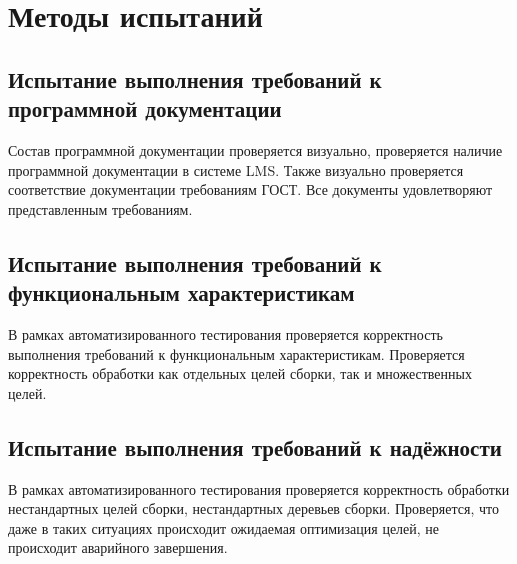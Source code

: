 \section{Методы испытаний}

\subsection{Испытание выполнения требований к программной документации}

Состав программной документации проверяется визуально, проверяется наличие программной документации в системе LMS. Также визуально проверяется соответствие документации требованиям ГОСТ. 
Все документы удовлетворяют представленным требованиям.

\subsection{Испытание выполнения требований к функциональным характеристикам}

В рамках автоматизированного тестирования проверяется корректность выполнения требований к функциональным характеристикам. Проверяется корректность обработки как отдельных целей сборки, так и множественных целей.

\subsection{Испытание выполнения требований к надёжности}

В рамках автоматизированного тестирования проверяется корректность обработки нестандартных целей сборки, нестандартных деревьев сборки. Проверяется, что даже в таких ситуациях происходит ожидаемая оптимизация целей, не происходит аварийного завершения.